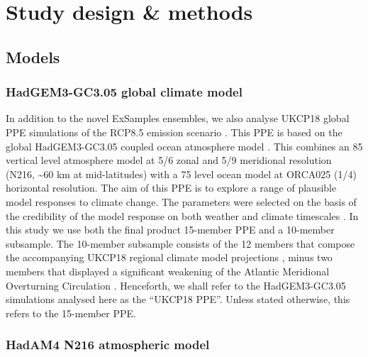 \section{Study design \& methods}

  \subsection{Models}
  
    \subsubsection{HadGEM3-GC3.05 global climate model}

      In addition to the novel ExSamples ensembles, we also analyse UKCP18 global PPE simulations of the RCP8.5 emission scenario \citep{riahi_rcp_2011}. This PPE is based on the global HadGEM3-GC3.05 coupled ocean atmosphere model \citep{murphy_ukcp18_2018,williams_met_2018}. This combines an 85 vertical level atmosphere model at 5/6\textdegree{} zonal and 5/9\textdegree{} meridional resolution (N216, \textasciitilde60 km at mid-latitudes) with a 75 level ocean model at ORCA025 (1/4\textdegree) horizontal resolution. The aim of this PPE is to explore a range of plausible model responses to climate change. The parameters were selected on the basis of the credibility of the model response on both weather and climate timescales \citep{karmalkar_finding_2019,sexton_finding_2019,sexton_perturbed_2021,yamazaki_perturbed_2021}. In this study we use both the final product 15-member PPE and a 10-member subsample. The 10-member subsample consists of the 12 members that compose the accompanying UKCP18 regional climate model projections \citep{murphy_ukcp18_2018}, minus two members that displayed a significant weakening of the Atlantic Meridional Overturning Circulation \citep{sexton_assessment_2020}. Henceforth, we shall refer to the HadGEM3-GC3.05 simulations analysed here as the ``UKCP18 PPE''. Unless stated otherwise, this refers to the 15-member PPE.
    
    \subsubsection{HadAM4 N216 atmospheric model}

